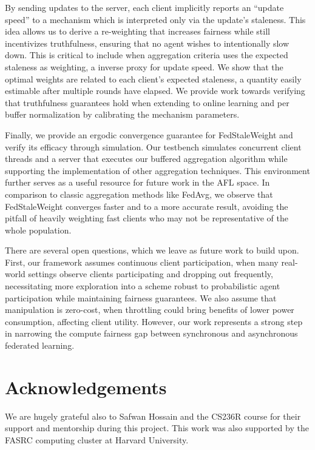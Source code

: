 \documentclass{article}
\begin{document}
By sending updates to the server, each client implicitly reports an ``update speed'' to a mechanism which is interpreted only via the update's staleness. This idea allows us to derive a re-weighting that increases fairness while still incentivizes truthfulness, ensuring that no agent wishes to intentionally slow down. This is critical to include when aggregation criteria uses the expected staleness as weighting, a inverse proxy for update speed. We show that the optimal weights are related to each client's expected staleness, a quantity easily estimable after multiple rounds have elapsed. We provide work towards verifying that truthfulness guarantees hold when extending to online learning and per buffer normalization by calibrating the mechanism parameters. 

Finally, we provide an ergodic convergence guarantee for FedStaleWeight and verify its efficacy through simulation. Our testbench simulates concurrent client threads and a server that executes our buffered aggregation algorithm while supporting the implementation of other aggregation techniques. This environment further serves as a useful resource for future work in the AFL space. In comparison to classic aggregation methods like FedAvg, we observe that FedStaleWeight converges faster and to a more accurate result, avoiding the pitfall of heavily weighting fast clients who may not be representative of the whole population.

There are several open questions, which we leave as future work to build upon. First, our framework assumes continuous client participation, when many real-world settings observe clients participating and dropping out frequently, necessitating more exploration into a scheme robust to probabilistic agent participation while maintaining fairness guarantees. We also assume that manipulation is zero-cost, when throttling could bring benefits of lower power consumption, affecting client utility. However, our work represents a strong step in narrowing the compute fairness gap between synchronous and asynchronous federated learning.

\section{Acknowledgements}
We are hugely grateful also to Safwan Hossain and the CS236R course for their support and mentorship during this project. This work was also supported by the FASRC computing cluster at Harvard University.


 
\nocite{*}

\end{document}
